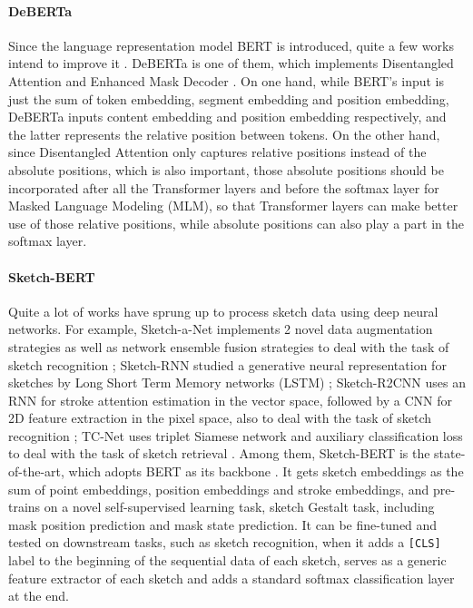 \documentclass{article}
\begin{document}
\paragraph{DeBERTa}
Since the language representation model BERT is introduced, quite a few works intend to improve it \citep{RoBERTa, DeBERTa}.
DeBERTa is one of them, which implements Disentangled Attention and Enhanced Mask Decoder \citep{DeBERTa, Package}.
On one hand, while BERT’s input is just the sum of token embedding, segment embedding and position embedding, DeBERTa inputs content embedding and position embedding respectively, and the latter represents the relative position between tokens.
On the other hand, since Disentangled Attention only captures relative positions instead of the absolute positions, which is also important, those absolute positions should be incorporated after all the Transformer layers and before the softmax layer for Masked Language Modeling (MLM), so that Transformer layers can make better use of those relative positions, while absolute positions can also play a part in the softmax layer.

\paragraph{Sketch-BERT}
Quite a lot of works have sprung up to process sketch data using deep neural networks. For example, Sketch-a-Net implements 2 novel data augmentation strategies as well as network ensemble fusion strategies to deal with the task of sketch recognition \citep{Sketch-a-Net}; Sketch-RNN studied a generative neural representation for sketches by Long Short Term Memory networks (LSTM) \citep{Sketch-RNN}; Sketch-R2CNN uses an RNN for stroke attention estimation in the vector space, followed by a CNN for 2D feature extraction in the pixel space, also to deal with the task of sketch recognition \citep{Sketch-R2CNN}; TC-Net uses triplet Siamese network and auxiliary classification loss to deal with the task of sketch retrieval \citep{TC-Net}. Among them, Sketch-BERT is the state-of-the-art, which adopts BERT as its backbone \citep{Sketch-BERT}.
It gets sketch embeddings as the sum of point embeddings, position embeddings and stroke embeddings, and pre-trains on a novel self-supervised learning task, sketch Gestalt task, including mask position prediction and mask state prediction.
It can be fine-tuned and tested on downstream tasks, such as sketch recognition, when it adds a \verb|[CLS]| label to the beginning of the sequential data of each sketch, serves as a generic feature extractor of each sketch and adds a standard softmax classification layer at the end.
\end{document}
